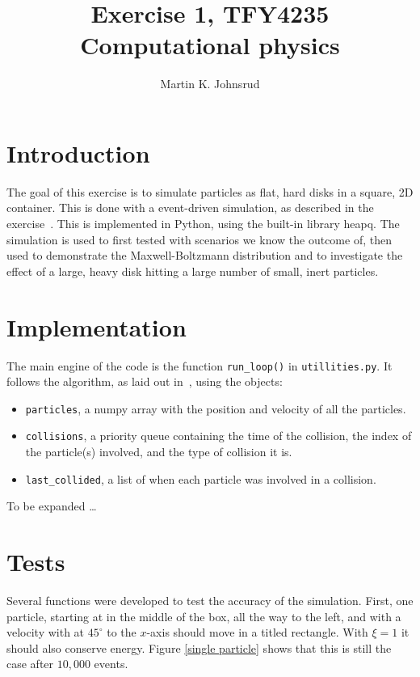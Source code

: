\documentclass{article}
\title{Exercise 1, TFY4235 Computational physics}
\author{Martin K. Johnsrud}
\date{}
\begin{document}
    \maketitle
    \section*{Introduction}
        The goal of this exercise is to simulate particles as flat, hard disks in a square, 2D container. This is done with a event-driven simulation, as described in the exercise~\cite{exercise}. This is implemented in Python, using the built-in library heapq. The simulation is used to first tested with scenarios we know the outcome of, then used to demonstrate the Maxwell-Boltzmann distribution and to investigate the effect of a large, heavy disk hitting a large number of small, inert particles.
    
    \section*{Implementation}
        The main engine of the code is the function \verb|run_loop()| in \verb|utillities.py|. It follows the algorithm, as laid out in~\cite{exercise}, using the objects:
        \begin{itemize}
            \item \verb|particles|, a numpy array with the position and velocity of all the particles.
            \item \verb|collisions|, a priority queue containing the time of the collision, the index of the particle(s) involved, and the type of collision it is.
            \item \verb|last_collided|, a list of when each particle was involved in a collision.
        \end{itemize}
        To be expanded \dots

    \section*{Tests}
        Several functions were developed to test the accuracy of the simulation. First, one particle, starting at in the middle of the box, all the way to the left, and with a velocity with at $45^\circ$ to the $x$-axis should move in a titled rectangle. With $\xi=1$ it should also conserve energy. Figure \ref{single particle} shows that this is still the case after $10,000$ events.
\end{document}
